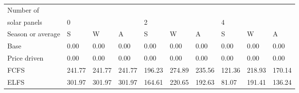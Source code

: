 \begin{table}[h] 
\centering 
\begin{tabular}{l|lll|lll|lll}Number of \\ solar panels&0& & &2& & &4& & \\ \hline 
Season or average & S & W & A & S & W & A & S & W & A \\ \hline 
Base&0.00&0.00&0.00&0.00&0.00&0.00&0.00&0.00&0.00 \\ 
Price driven&0.00&0.00&0.00&0.00&0.00&0.00&0.00&0.00&0.00 \\ 
FCFS&241.77&241.77&241.77&196.23&274.89&235.56&121.36&218.93&170.14 \\ 
ELFS&301.97&301.97&301.97&164.61&220.65&192.63&81.07&191.41&136.24 \\ 
\end{tabular} 
\end{table}